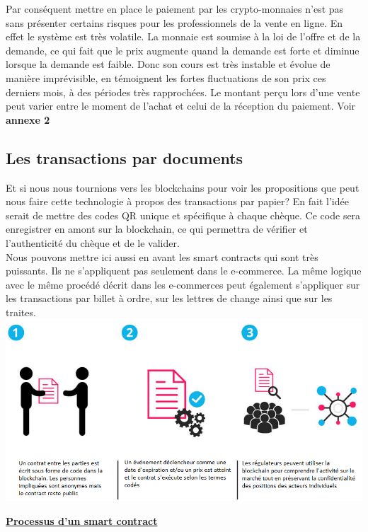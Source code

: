 \documentclass[12pt]{report}
\begin{document}
\hspace{1cm}Par conséquent mettre en place le paiement par les crypto-monnaies n'est pas sans présenter certains risques pour les professionnels de la vente en ligne. En effet le système est très volatile. La monnaie est soumise à la loi de l'offre et de la demande, ce qui fait que le prix augmente quand la demande est forte et diminue lorsque la demande est faible. Donc son cours est très instable et évolue de manière imprévisible, en témoignent les fortes fluctuations de son prix ces derniers mois, à des périodes très rapprochées. Le montant perçu lors d'une vente peut varier entre le moment de l'achat et celui de la réception du paiement. Voir \textbf{annexe 2} \\


    \subsection{Les transactions par documents}
\hspace{1cm} Et si nous nous tournions vers les blockchains pour voir les propositions que peut nous faire cette technologie à propos des transactions par papier? En fait l'idée serait de mettre des codes QR unique et spécifique à chaque chèque. Ce code sera enregistrer en amont sur la blockchain, ce qui permettra de vérifier et l'authenticité du chèque et de le valider. \\

\hspace{1cm} Nous pouvons mettre ici aussi en avant les smart contracts qui sont très puissants. Ils ne s'appliquent pas seulement dans le e-commerce. La même logique avec le même procédé décrit dans les e-commerces peut également s'appliquer sur les transactions par billet à ordre, sur les lettres de change ainsi que sur les traites.\\

\includegraphics[width=1\textwidth]{contract_smart}
\begin{center}
   \textbf{\underline{Processus d'un smart contract}} \\[1cm]
\end{center}
\end{document}
